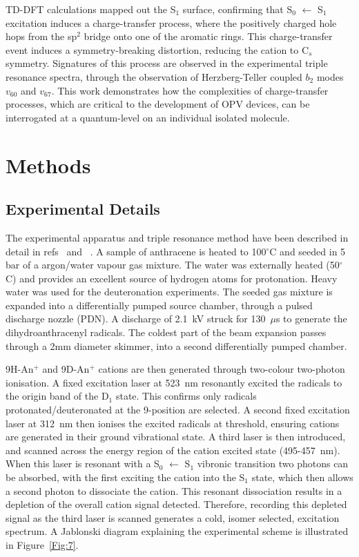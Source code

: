 \documentclass[journal=jpcafh,manuscript=article,layout=onecolumn, 12pt]{achemso}
\newcommand{\onlinecite}[1]{\hspace{-1 ex} \nocite{#1}\citenum{#1}}
\begin{document}
TD-DFT calculations mapped out the S$_1$ surface, confirming that S$_0$ $\leftarrow$ S$_1$ excitation induces a charge-transfer process, where the positively charged hole hops from the sp$^2$ bridge onto one of the aromatic rings. This charge-transfer event induces a symmetry-breaking distortion, reducing the cation to C$_s$ symmetry. Signatures of this process are observed in the experimental triple resonance spectra, through the observation of Herzberg-Teller coupled $b_2$ modes $v_{60}$ and $v_{67}$. This work demonstrates how the complexities of charge-transfer processes, which are critical to the development of OPV devices, can be interrogated at a quantum-level on an individual isolated molecule.

\section{Methods}
\subsection{Experimental Details}
The experimental apparatus and triple resonance method have been described in detail in refs~\onlinecite{kre13} and~\onlinecite{kre19}. A sample of anthracene is heated to 100$^\circ$C and seeded in 5 bar of a argon/water vapour gas mixture. The water was externally heated (50$^\circ$C) and provides an excellent source of hydrogen atoms for protonation. Heavy water was used for the deuteronation experiments. The seeded gas mixture is expanded into a differentially pumped source chamber, through a pulsed discharge nozzle (PDN). A discharge of 2.1~kV struck for 130~$\mu$s to generate the dihydroanthracenyl radicals. The coldest part of the beam expansion passes through a 2mm diameter skimmer, into a second differentially pumped chamber.

9H-An$^+$ and 9D-An$^+$ cations are then generated through two-colour two-photon ionisation. A fixed excitation laser at 523~nm resonantly excited the radicals to the origin band of the D$_1$ state. This confirms only radicals protonated/deuteronated at the 9-position are selected. A second fixed excitation laser at 312~nm then ionises the excited radicals at threshold, ensuring cations are generated in their ground vibrational state. A third laser is then introduced, and scanned across the energy region of the cation excited state (495-457~nm). When this laser is resonant with a S$_0$ $\leftarrow$ S$_1$ vibronic transition two photons can be absorbed, with the first exciting the cation into the S$_1$ state, which then allows a second photon to dissociate the cation. This resonant dissociation results in a depletion of the overall cation signal detected. Therefore, recording this depleted signal as the third laser is scanned generates a cold, isomer selected, excitation spectrum. A Jablonski diagram explaining the experimental scheme is illustrated in Figure~\ref{Fig:7}.
\end{document}
